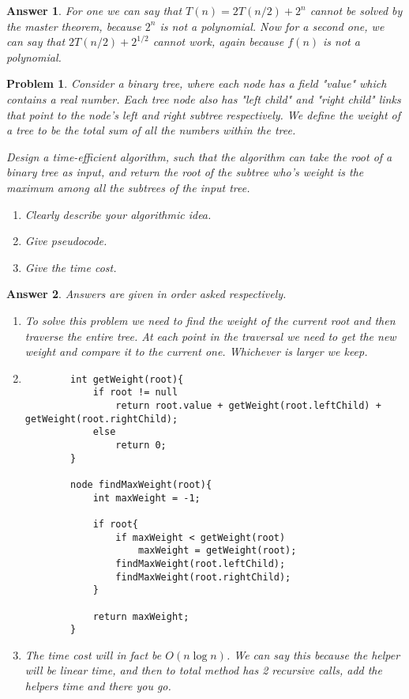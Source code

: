 \documentclass[11pt]{article}
\newtheorem{problem}{Problem}
\newtheorem{answer}{Answer}
\begin{document}
\begin{answer}
 \label{ans:2} For one we can say that $T(n) = 2T(n/2) + 2^n$ cannot be solved by the master theorem, because $2^n$ is not a polynomial. Now for a second one, we can say that $2T(n/2) + 2^{1/2}$ cannot work, again because $f(n)$ is not a polynomial.
\end{answer}

\bigskip

\begin{problem}
 \label{prob:3} Consider a binary tree, where each node has a field "value" which contains a real number. Each tree node also has "left child" and "right child" links that point to the node's left and right subtree respectively. We define the weight of a tree to be the total sum of all the numbers within the tree.
 
 Design a time-efficient algorithm, such that the algorithm can take the root of a binary tree as input, and return the root of the subtree who's weight is the maximum among all the subtrees of the input tree.
 
 \begin{enumerate}
 	\item Clearly describe your algorithmic idea.
 	\item Give pseudocode.
 	\item Give the time cost.
 \end{enumerate}
\end{problem}

\begin{answer}
 \label{ans:3} Answers are given in order asked respectively.
 \begin{enumerate}
 	\item To solve this problem we need to find the weight of the current root and then traverse the entire tree. At each point in the traversal we need to get the new weight and compare it to the current one. Whichever is larger we keep.
 	\item 
 	\begin{lstlisting}
	 	int getWeight(root){
		 	if root != null
			 	return root.value + getWeight(root.leftChild) + getWeight(root.rightChild);
			else
				return 0;
	 	}
	 	
	 	node findMaxWeight(root){
		 	int maxWeight = -1;
		 	
		 	if root{
			 	if maxWeight < getWeight(root)
				 	maxWeight = getWeight(root);
				findMaxWeight(root.leftChild);
				findMaxWeight(root.rightChild);
		 	}
		 	
		 	return maxWeight;
	 	}
 	\end{lstlisting}
 	\item The time cost will in fact be $O(n \log{n})$. We can say this because the helper will be linear time, and then to total method has 2 recursive calls, add the helpers time and there you go.
 \end{enumerate}
\end{answer}
 
\end{document}
